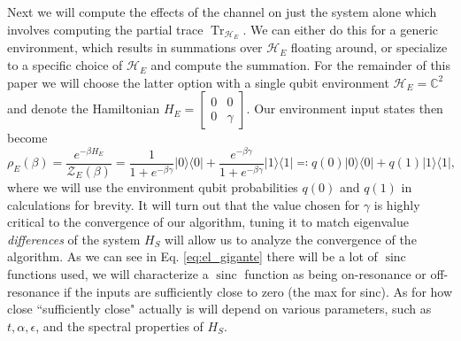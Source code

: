 \documentclass[
 amsmath,amssymb,
 aps,
onecolumn, 
nofootinbib]{revtex4-2}
\newcommand{\ketbra}[2]{| #1\rangle\! \langle #2|}
\DeclareMathOperator{\Tr}{Tr}
\newcommand{\hilb}{\mathcal{H}}
\newcommand{\partfun}{\mathcal{Z}}
\DeclareMathOperator{\sinc}{sinc}
\begin{document}
Next we will compute the effects of the channel on just the system alone which involves computing the partial trace $\Tr_{\hilb_E}$. We can either do this for a generic environment, which results in summations over $\hilb_E$ floating around, or specialize to a specific choice of $\hilb_E$ and compute the summation. For the remainder of this paper we will choose the latter option with a single qubit environment $\hilb_E = \mathbb{C}^2$ and denote the Hamiltonian $H_E = \begin{bmatrix} 0 & 0 \\ 0 & \gamma \end{bmatrix}$. Our environment input states then become
\begin{equation}
    \rho_E(\beta) = \frac{e^{-\beta H_E}}{\partfun_E(\beta)} = \frac{1}{1 + e^{-\beta \gamma}} \ketbra{0}{0} + \frac{e^{-\beta \gamma}}{1 + e^{-\beta \gamma}} \ketbra{1}{1} \eqqcolon q(0) \ketbra{0}{0} + q(1) \ketbra{1}{1} \label{eq:env_state_def},
\end{equation}
where we will use the environment qubit probabilities $q(0)$ and $q(1)$ in calculations for brevity. It will turn out that the value chosen for $\gamma$ is highly critical to the convergence of our algorithm, tuning it to match eigenvalue \emph{differences} of the system $H_S$ will allow us to analyze the convergence of the algorithm. As we can see in Eq. \eqref{eq:el_gigante} there will be a lot of $\sinc$ functions used, we will characterize a $\sinc$ function as being on-resonance or off-resonance if the inputs are sufficiently close to zero (the max for sinc). As for how close ``sufficiently close" actually is will depend on various parameters, such as $t, \alpha, \epsilon$, and the spectral properties of $H_S$.  
\end{document}
